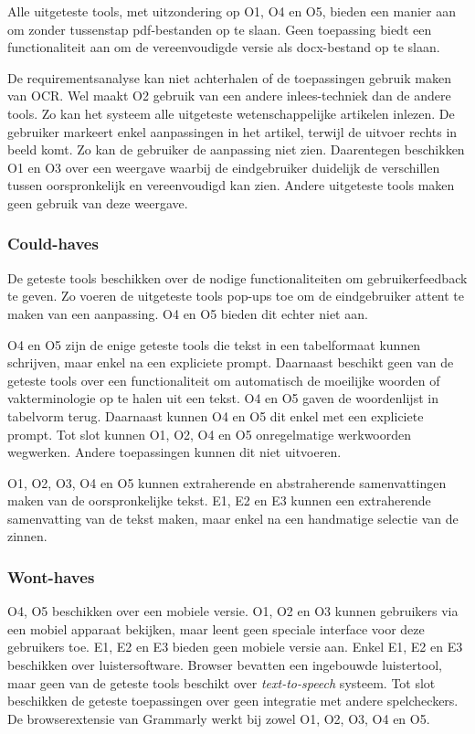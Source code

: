 Alle uitgeteste tools, met uitzondering op O1, O4 en O5, bieden een manier aan om zonder tussenstap pdf-bestanden op te slaan. Geen toepassing biedt een functionaliteit aan om de vereenvoudigde versie als docx-bestand op te slaan.

\medspace

De requirementsanalyse kan niet achterhalen of de toepassingen gebruik maken van OCR. Wel maakt O2 gebruik van een andere inlees-techniek dan de andere tools. Zo kan het systeem alle uitgeteste wetenschappelijke artikelen inlezen. De gebruiker markeert enkel aanpassingen in het artikel, terwijl de uitvoer rechts in beeld komt. Zo kan de gebruiker de aanpassing niet zien. Daarentegen beschikken O1 en O3 over een weergave waarbij de eindgebruiker duidelijk de verschillen tussen oorspronkelijk en vereenvoudigd kan zien. Andere uitgeteste tools maken geen gebruik van deze weergave.

\subsubsection{Could-haves}

De geteste tools beschikken over de nodige functionaliteiten om gebruikerfeedback te geven. Zo voeren de uitgeteste tools pop-ups toe om de eindgebruiker attent te maken van een aanpassing. O4 en O5 bieden dit echter niet aan. 

\medspace

O4 en O5 zijn de enige geteste tools die tekst in een tabelformaat kunnen schrijven, maar enkel na een expliciete prompt. Daarnaast beschikt geen van de geteste tools over een functionaliteit om automatisch de moeilijke woorden of vakterminologie op te halen uit een tekst. O4 en O5 gaven de woordenlijst in tabelvorm terug. Daarnaast kunnen O4 en O5 dit enkel met een expliciete prompt. Tot slot kunnen O1, O2, O4 en O5 onregelmatige werkwoorden wegwerken. Andere toepassingen kunnen dit niet uitvoeren.

\medspace

O1, O2, O3, O4 en O5 kunnen extraherende en abstraherende samenvattingen maken van de oorspronkelijke tekst. E1, E2 en E3 kunnen een extraherende samenvatting van de tekst maken, maar enkel na een handmatige selectie van de zinnen. 


\subsubsection{Wont-haves}

O4, O5 beschikken over een mobiele versie. O1, O2 en O3 kunnen gebruikers via een mobiel apparaat bekijken, maar leent geen speciale interface voor deze gebruikers toe. E1, E2 en E3 bieden geen mobiele versie aan. Enkel E1, E2 en E3 beschikken over luistersoftware. Browser bevatten een ingebouwde luistertool, maar geen van de geteste tools beschikt over \textit{text-to-speech} systeem. Tot slot beschikken de geteste toepassingen over geen integratie met andere spelcheckers. De browserextensie van Grammarly werkt bij zowel O1, O2, O3, O4 en O5.


